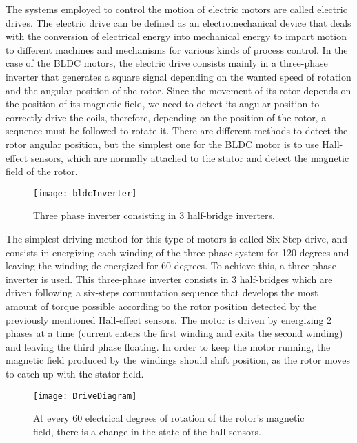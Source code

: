 The systems employed to control the motion of electric motors are called electric drives. The electric drive can be defined as an electromechanical device that deals with the conversion of electrical energy into mechanical energy to impart motion to different machines and mechanisms for various kinds of process control. In the case of the BLDC motors, the electric drive consists mainly in a three-phase inverter that generates a square signal depending on the wanted speed of rotation and the angular position of the rotor. Since the movement of its rotor depends on the position of its magnetic field, we need to detect its angular position to correctly drive the coils, therefore, depending on the position of the rotor, a sequence must be followed to rotate it. There are different methods to detect the rotor angular position, but the simplest one for the BLDC motor is to use Hall-effect sensors, which are normally attached to the stator and detect the magnetic field of the rotor. \\

\begin{figure} [H]
\centering\texttt{[image: bldcInverter]}
\caption{Three phase inverter consisting in 3 half-bridge inverters.}
\label{fig:BLDC_Inverter}
\end{figure}

The simplest driving method for this type of motors is called Six-Step drive, and consists in energizing each winding of the three-phase system for 120 degrees and leaving the winding de-energized for 60 degrees. To achieve this, a three-phase inverter is used. This three-phase inverter consists in 3 half-bridges which are driven following a six-steps commutation sequence that develops the most amount of torque possible according to the rotor position detected by the previously mentioned Hall-effect sensors. The motor is driven by energizing 2 phases at a time (current enters the first winding and exits the second winding) and leaving the third phase floating. In order to keep the motor running, the magnetic field produced by the windings should shift position, as the rotor moves to catch up with the stator field.

\begin{figure} [H]
\centering\texttt{[image: DriveDiagram]}
\caption{At every 60 electrical degrees of rotation of the rotor's magnetic field, there is a change in the state of the hall sensors.}
\label{fig:BLDC_pulses_sequence}
\end{figure}

